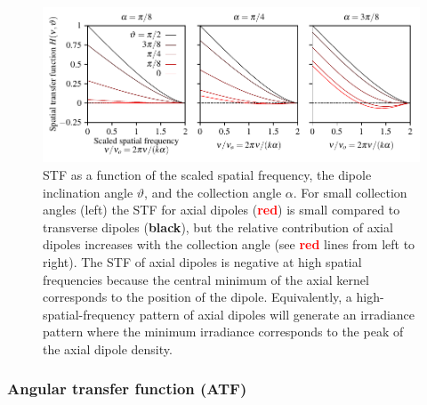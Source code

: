\documentclass{osa-article}
\begin{document}
\begin{figure}[h]
 \centering
   \centering
   \includegraphics[scale=0.8]{../figures/stf/stf.pdf}
   \caption{STF as a function of the scaled spatial frequency, the dipole
     inclination angle $\vartheta$, and the collection angle $\alpha$. For small
     collection angles (left) the STF for axial dipoles
     (\textcolor{red}{\textbf{red}}) is small compared to transverse dipoles
     (\textbf{black}), but the relative contribution of axial dipoles increases
     with the collection angle (see \textcolor{red}{\textbf{red}} lines from
     left to right). The STF of axial dipoles is negative at high spatial
     frequencies because the central minimum of the axial kernel corresponds to
     the position of the dipole. Equivalently, a high-spatial-frequency pattern
     of axial dipoles will generate an irradiance pattern where the minimum
     irradiance corresponds to the peak of the axial dipole density.}
   \label{fig:odotf}
 \end{figure}

\subsubsection{Angular transfer function (ATF)}
\end{document}
